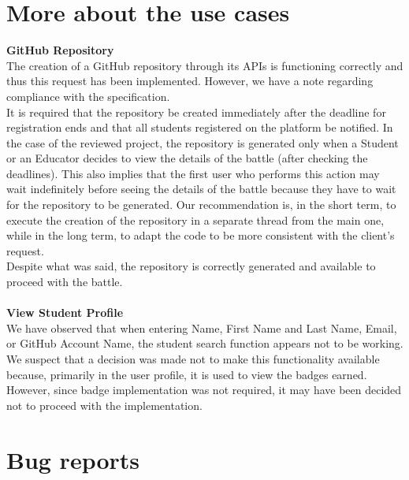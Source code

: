 \newpage

\section*{More about the use cases}

\textbf{GitHub Repository}\\
The creation of a GitHub repository through its APIs is functioning correctly and thus this request has been implemented. However, we have a note regarding compliance with the specification. \\
It is required that the repository be created immediately after the deadline for registration ends and that all students registered on the platform be notified. In the case of the reviewed project, the repository is generated only when a Student or an Educator decides to view the details of the battle (after checking the deadlines). 
This also implies that the first user who performs this action may wait indefinitely before seeing the details of the battle because they have to wait for the repository to be generated.
Our recommendation is, in the short term, to execute the creation of the repository in a separate thread from the main one, while in the long term, to adapt the code to be more consistent with the client's request.\\
Despite what was said, the repository is correctly generated and available to proceed with the battle.\\ \\
\textbf{View Student Profile}\\
We have observed that when entering Name, First Name and Last Name, Email, or GitHub Account Name, the student search function appears not to be working.
We suspect that a decision was made not to make this functionality available because, primarily in the user profile, it is used to view the badges earned. However, since badge implementation was not required, it may have been decided not to proceed with the implementation.

\section{Bug reports}

